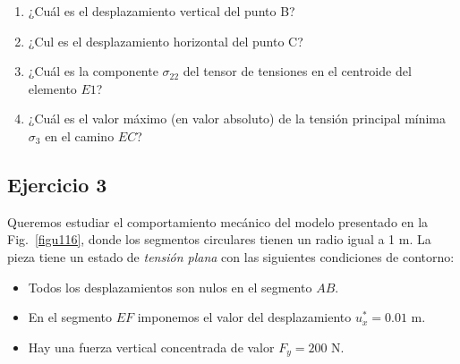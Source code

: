 \begin{enumerate}
\item ¿Cuál es el desplazamiento vertical del punto B?
\begin{multicols}{4}
\columnbreak
{} %
\columnbreak
{}
\columnbreak
{}
\end{multicols}
\item ¿Cul es el desplazamiento horizontal del punto C?
\begin{multicols}{4}
\columnbreak
{} %
\columnbreak
{}
\columnbreak
{}
\end{multicols}
\item ¿Cuál es la componente $\sigma_{22}$ del tensor de tensiones en el 
centroide del elemento $E1$?
\begin{multicols}{4}
\columnbreak
{}
\columnbreak
{}
\columnbreak
{} %
\end{multicols}
\item ¿Cuál es el valor máximo (en valor absoluto) de la tensión principal
mínima $\sigma_3$ en el camino $EC$?
\begin{multicols}{4}
\columnbreak
{}
\columnbreak
{}
\columnbreak
{}%
\end{multicols}
\end{enumerate}

\newpage

\subsection{Ejercicio  3}

Queremos estudiar el comportamiento mecánico del modelo presentado en la Fig.~\ref{figu116}, donde los segmentos circulares tienen un radio igual a 1 m. La pieza tiene un estado de \textit{tensión plana} con las siguientes condiciones de contorno:
\begin{itemize}
\item Todos los desplazamientos son nulos en el segmento $AB$.
\item En el segmento $EF$ imponemos el valor del desplazamiento $u_x^*=0.01$ m.
\item Hay una fuerza vertical concentrada de valor $F_y=200$ N.
\end{itemize}

